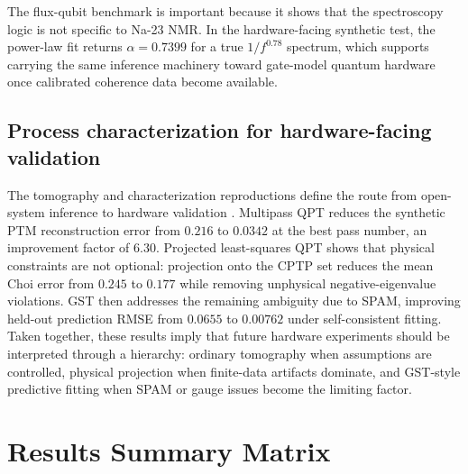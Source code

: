 \documentclass[11pt,a4paper]{article}
\begin{document}
The flux-qubit benchmark is important because it shows that the spectroscopy
logic is not specific to Na-23 NMR.  In the hardware-facing synthetic test, the
power-law fit returns $\alpha=0.7399$ for a true $1/f^{0.78}$ spectrum, which
supports carrying the same inference machinery toward gate-model quantum
hardware once calibrated coherence data become available.

\subsection{Process characterization for hardware-facing validation}

The tomography and characterization reproductions define the route from
open-system inference to hardware validation
\citep{multipass_qpt_2024,projected_ls_qpt_2022,gate_set_tomography_2021}.
Multipass QPT reduces the synthetic PTM reconstruction error from $0.216$ to
$0.0342$ at the best pass number, an improvement factor of $6.30$.  Projected
least-squares QPT shows that physical constraints are not optional: projection
onto the CPTP set reduces the mean Choi error from $0.245$ to $0.177$ while
removing unphysical negative-eigenvalue violations.  GST then addresses the
remaining ambiguity due to SPAM, improving held-out prediction RMSE from
$0.0655$ to $0.00762$ under self-consistent fitting.  Taken together, these
results imply that future hardware experiments should be interpreted through a
hierarchy: ordinary tomography when assumptions are controlled, physical
projection when finite-data artifacts dominate, and GST-style predictive fitting
when SPAM or gauge issues become the limiting factor.

\section{Results Summary Matrix}
\end{document}
